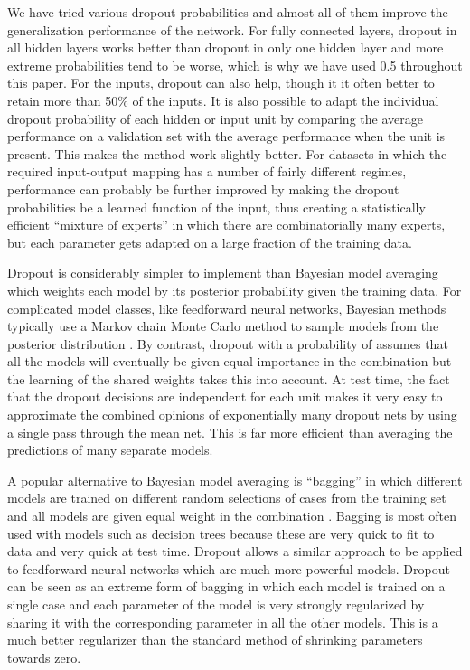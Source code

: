 \documentclass[12pt]{article}
\begin{document}
We have tried various dropout probabilities and almost all of them improve the
generalization performance of the network.  For fully connected layers, dropout in all
hidden layers works better than dropout in only one hidden layer and more extreme
probabilities tend to be worse, which is why we have used 0.5 throughout this paper.  For
the inputs, dropout can also help, though it it often better to retain more than 50\% of
the inputs. It is also possible to adapt the individual dropout probability of each hidden
or input unit by comparing the average performance on a validation set with the average
performance when the unit is present. This makes the method work slightly
better. For datasets in which the required input-output mapping has a
number of fairly different regimes, performance can probably be further improved by making
the dropout probabilities be a learned function of the input, thus creating a
statistically efficient ``mixture of experts'' \cite{Jacobs} in which there are
combinatorially many experts, but each parameter gets adapted on a large fraction of the
training data.

Dropout is considerably simpler to implement than Bayesian model averaging which weights
each model by its posterior probability given the training data. For complicated model
classes, like feedforward neural networks, Bayesian methods typically use a Markov chain
Monte Carlo method to sample models from the posterior distribution \cite{NealThesis}.  By
contrast, dropout with a probability of  assumes that all the models will eventually
be given equal importance in the combination but the learning of the shared weights takes
this into account. At test time, the fact that the dropout decisions are independent for
each unit makes it very easy to approximate the combined opinions of exponentially many
dropout nets by using a single pass through the mean net. This is far more efficient than
averaging the predictions of many separate models.

A popular alternative to Bayesian model averaging is ``bagging'' in which different models
are trained on different random selections of cases from the training set and all models
are given equal weight in the combination \cite{Breiman}. Bagging is most often used with
models such as decision trees because these are very quick to fit to data and very quick
at test time\cite{RandomForests}. Dropout allows a similar approach to be applied to feedforward
neural networks which are much more powerful models.  Dropout can be seen as an extreme
form of bagging in which each model is trained on a single case and each parameter of the
model is very strongly regularized by sharing it with the corresponding parameter in all
the other models. This is a much better regularizer than the standard method of shrinking
parameters towards zero.
\end{document}
